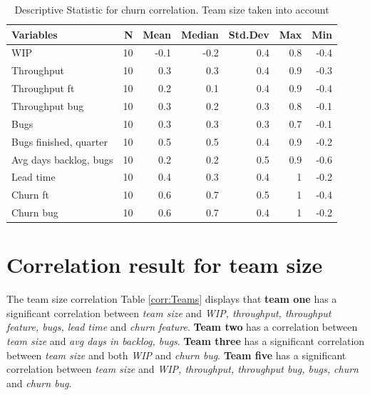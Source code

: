 \documentclass[UKenglish]{ifimaster}  %
\begin{document}
\begin{table}[!htbp]
 \caption{Descriptive Statistic for churn correlation. Team size taken into account}
 \centering
 \begin{tabular}{ | l | r | r | r | r | r | r | }
 \hline
\textbf{Variables}& \bf{N} & \bf{Mean} & \bf{Median} & \bf{Std.Dev} & \bf{Max} & \bf{Min} \\ \hline
WIP  & 10 & -0.1 & -0.2 & 0.4 & 0.8 & -0.4\\ \hline
Throughput  & 10 & 0.3 & 0.3 & 0.4 & 0.9 & -0.3\\ \hline
Throughput ft  & 10 & 0.2 & 0.1 & 0.4 & 0.9 & -0.4\\ \hline
Throughput bug  & 10 & 0.3 & 0.2 & 0.3 & 0.8 & -0.1\\ \hline
Bugs  & 10 & 0.3 & 0.3 & 0.3 & 0.7 & -0.1\\ \hline
Bugs finished, quarter  & 10 & 0.5 & 0.5 & 0.4 & 0.9 & -0.2\\ \hline
Avg days backlog, bugs  & 10 & 0.2 & 0.2 & 0.5 & 0.9 & -0.6\\ \hline
Lead time & 10 & 0.4 & 0.3 & 0.4 & 1 & -0.2\\ \hline
Churn ft  & 10 & 0.6 & 0.7 & 0.5 & 1 & -0.4\\ \hline
Churn bug  & 10 & 0.6 & 0.7 & 0.4 & 1 & -0.2\\ \hline
\end{tabular}
 \label{DS:corr:churn:v2}
 \end{table}
 
 
 \section{Correlation result for team size}
 \label{sec:corr:tz}
 The team size correlation Table \ref{corr:Teams} displays that \textbf{team one} has a significant correlation between \textit{team size} and  \textit{WIP, throughput, throughput feature, bugs, lead time} and \textit{churn feature}. \textbf{Team two} has a correlation between \textit{team size} and \textit{avg days in backlog, bugs}. \textbf{Team three} has a significant correlation  between \textit{team size} and both  \textit{WIP} and \textit{churn bug}. \textbf{Team five} has a significant correlation between \textit{team size} and \textit{WIP, throughput, throughput bug, bugs, churn} and \textit{churn bug}.
\end{document}
